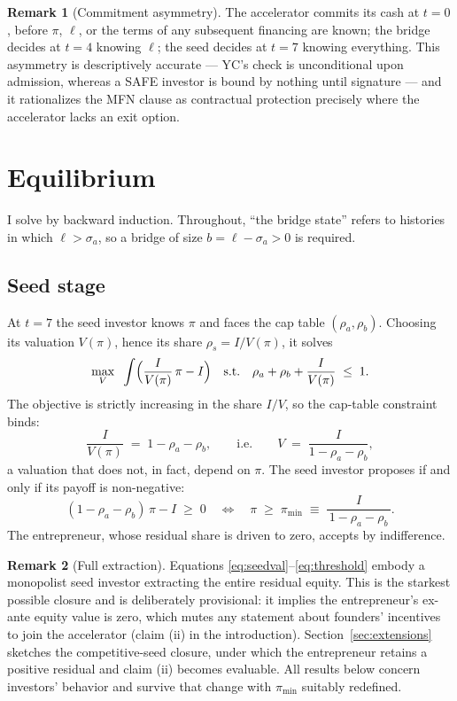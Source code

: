 \documentclass[11pt]{article}
\theoremstyle{definition}
\newtheorem{remark}{Remark}
\newcommand{\pimin}{\pi_{\min}}
\begin{document}
\begin{remark}[Commitment asymmetry]
The accelerator commits its cash at $t=0$, before $\pi$, $\ell$, or the terms of any subsequent financing are known; the bridge decides at $t=4$ knowing $\ell$; the seed decides at $t=7$ knowing everything. This asymmetry is descriptively accurate --- YC's check is unconditional upon admission, whereas a SAFE investor is bound by nothing until signature --- and it rationalizes the MFN clause as contractual protection precisely where the accelerator lacks an exit option.
\end{remark}

\section{Equilibrium}\label{sec:equilibrium}

I solve by backward induction. Throughout, ``the bridge state'' refers to histories in which $\ell > \sigma_a$, so a bridge of size $b = \ell - \sigma_a > 0$ is required.

\subsection{Seed stage}

At $t=7$ the seed investor knows $\pi$ and faces the cap table $(\rho_a, \rho_b)$. Choosing its valuation $V(\pi)$, hence its share $\rho_s = I/V(\pi)$, it solves
\[
\max_{V}\;\; \int \Bigl(\frac{I}{V(\pi)}\,\pi - I\Bigr) \quad
\text{s.t.}\quad \rho_a + \rho_b + \frac{I}{V(\pi)} \;\le\; 1 .
\]
The objective is strictly increasing in the share $I/V$, so the cap-table constraint binds:
\begin{equation}
\frac{I}{V(\pi)} \;=\; 1 - \rho_a - \rho_b,
\qquad\text{i.e.}\qquad
V \;=\; \frac{I}{1-\rho_a-\rho_b},
\label{eq:seedval}
\end{equation}
a valuation that does not, in fact, depend on $\pi$. The seed investor proposes if and only if its payoff is non-negative:
\begin{equation}
(1-\rho_a-\rho_b)\,\pi - I \;\ge\; 0
\quad\Longleftrightarrow\quad
\pi \;\ge\; \pimin \;\equiv\; \frac{I}{\,1-\rho_a-\rho_b\,}.
\label{eq:threshold}
\end{equation}
The entrepreneur, whose residual share is driven to zero, accepts by indifference.

\begin{remark}[Full extraction]\label{rem:fullext}
Equations \eqref{eq:seedval}--\eqref{eq:threshold} embody a monopolist seed investor extracting the entire residual equity. This is the starkest possible closure and is deliberately provisional: it implies the entrepreneur's ex-ante equity value is zero, which mutes any statement about founders' incentives to join the accelerator (claim (ii) in the introduction). Section~\ref{sec:extensions} sketches the competitive-seed closure, under which the entrepreneur retains a positive residual and claim (ii) becomes evaluable. All results below concern investors' behavior and survive that change with $\pimin$ suitably redefined.
\end{remark}
\end{document}
